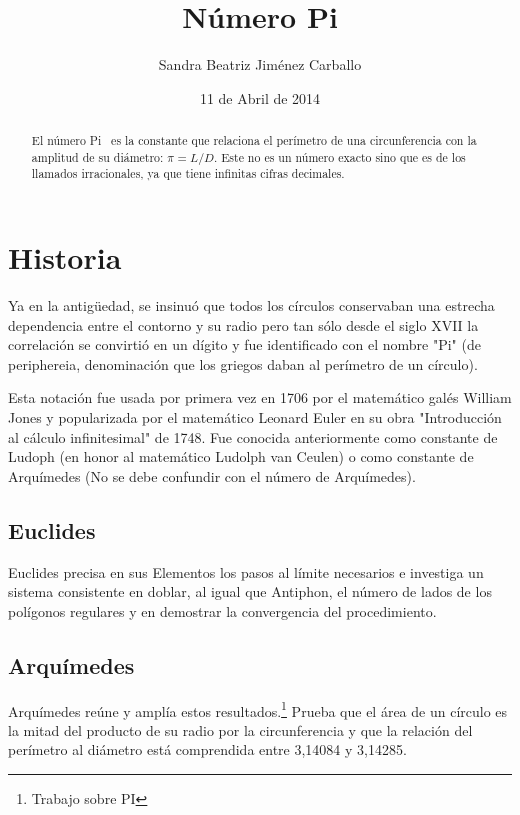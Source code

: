 \documentclass[spanish,11pt,a4paper]{article}
\begin{document}
 
\title{Número Pi}
\author{Sandra Beatriz Jiménez Carballo}
\date{11 de Abril de 2014}
\maketitle

\begin{abstract}
 El número Pi~\cite{Lamport:LDP94} es la constante que relaciona el perímetro de una circunferencia con la amplitud de su diámetro: $\pi = L/D$.
 Este no es un número exacto sino que es de los llamados irracionales, ya que tiene infinitas cifras decimales.
\end{abstract}

\section{Historia}
Ya en la antigüedad, se insinuó que todos los círculos conservaban una estrecha dependencia entre el contorno y su radio pero tan sólo desde el
siglo XVII la correlación se convirtió en un dígito\cite{gibaldMLA:2009} y fue identificado con el nombre "Pi" (de periphereia, denominación que los griegos daban
al perímetro de un círculo).

Esta notación fue usada por primera vez en 1706 por el matemático galés William Jones y popularizada por el matemático Leonard Euler en su obra
"Introducción al cálculo infinitesimal" de 1748. Fue conocida anteriormente como constante de Ludoph (en honor al matemático Ludolph van Ceulen)
o como constante de Arquímedes (No se debe confundir con el número de Arquímedes).

\subsection{Euclides}
Euclides precisa en sus Elementos los pasos al límite necesarios e investiga un sistema consistente en doblar, al igual que Antiphon, el número de
lados de los polígonos regulares y en demostrar la convergencia del procedimiento.

\subsection{Arquímedes}
Arquímedes reúne y amplía estos resultados.\footnote{Trabajo sobre PI} Prueba que el área de un círculo es la mitad del producto de su radio por la circunferencia y que la
relación del perímetro al diámetro está comprendida entre 3,14084 y 3,14285.
\end{document}
